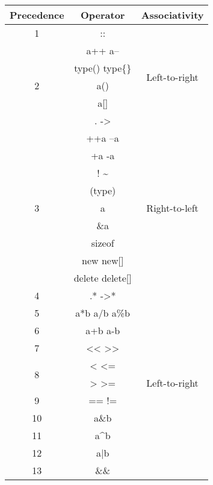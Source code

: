 \begin{center}
	\begin{tabular}{|c|c|c|}
		\hline
		Precedence			&	Operator					&	Associativity					\\
		\hline
		1					&	\ttfamily ::				&	\multirow{6}{*}{Left-to-right}	\\
		\cline{1-2}
		\multirow{5}{*}{2}	&	\ttfamily a++ a--			&									\\
							&	\ttfamily type() type\{\}	&									\\
							&	\ttfamily a()				&									\\
							&	\ttfamily a[]				&									\\
							&	\ttfamily . ->				&									\\
		\hline	
		\multirow{9}{*}{3}	&	\ttfamily ++a --a			&	\multirow{9}{*}{Right-to-left}	\\
							&	\ttfamily +a -a				&									\\
							&	\ttfamily ! \~				&									\\
							&	\ttfamily (type)			&									\\
							&	\ttfamily *a				&									\\
							&	\ttfamily \&a				&									\\
							&	\ttfamily sizeof			&									\\
							&	\ttfamily new new[]			&									\\
							&	\ttfamily delete delete[]	&									\\
		\hline
		4					&	\ttfamily .* ->*			&	\multirow{12}{*}{Left-to-right}	\\
		\cline{1-2}
		5					&	\ttfamily a*b a/b a\%b		&									\\
		\cline{1-2}
		6					&	\ttfamily a+b a-b			&									\\
		\cline{1-2}
		7					&	\ttfamily << >>				&									\\
		\cline{1-2}
		\multirow{2}{*}{8}	&	\ttfamily < <=				&									\\
							&	\ttfamily > >=				&									\\
		\cline{1-2}
		9					&	\ttfamily == !=				&									\\
		\cline{1-2}
		10					&	\ttfamily a\&b				&									\\
		\cline{1-2}
		11					&	\ttfamily a\^{}b			&									\\
		\cline{1-2}
		12					&	\ttfamily a|b				&									\\
		\cline{1-2}
		13					&	\ttfamily \&\&				&									\\

\end{tabular}
\end{center}
